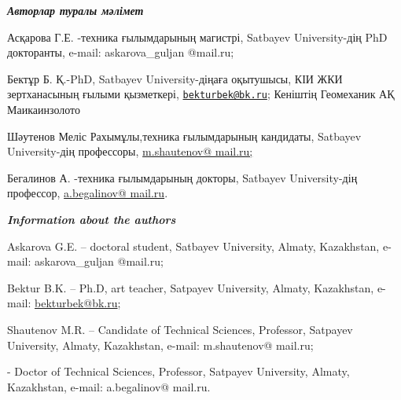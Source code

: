 \begin{authorinfo}
\hspace{1em}\emph{{\bfseries Авторлар туралы мәлімет}}

Асқарова Г.Е. -техника ғылымдарының магистрі, Satbayev University-дің
PhD докторанты, e-mail: askarova\_guljan @mail.ru;

Бектұр Б. Қ.-PhD, Satbayev University-діңаға оқытушысы, КІИ ЖКИ
зертханасының ғылыми қызметкері,
\href{mailto:bekturbek@bk.ru}{\nolinkurl{bekturbek@bk.ru}}; Кеніштің
Геомеханик АҚ Маикаинзолото

Шәутенов Меліс Рахымұлы,техника ғылымдарының кандидаты, Satbayev
University-дің профессоры,
\href{mailto:m.shautenov@satbayev.university}{m.shautenov@ mail.ru;}

Бегалинов А. -техника ғылымдарының докторы, Satbayev University-дің
профессор, \href{mailto:a.begalinov@\%20mail.ru}{a.begalinov@ mail.ru}.

\hspace{1em}\emph{{\bfseries Information about the authors}}

Askarova G.E. -- doctoral student, Satbayev University, Almaty,
Kazakhstan, e-mail: askarova\_guljan @mail.ru;

Bektur B.K. -- Ph.D, art teacher, Satpayev University, Almaty,
Kazakhstan, e-mail: \href{mailto:bekturbek@bk.run}{bekturbek@bk.ru};

Shautenov M.R. -- Candidate of Technical Sciences, Professor, Satpayev
University, Almaty, Kazakhstan, e-mail: m.shautenov@ mail.ru;

 - Doctor of Technical Sciences, Professor, Satpayev
University, Almaty, Kazakhstan, e-mail: a.begalinov@ mail.ru.
\end{authorinfo}
